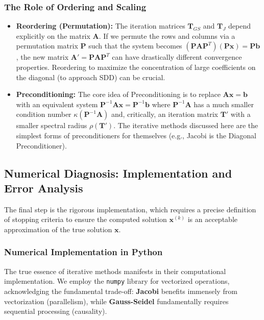 \subsubsection{The Role of Ordering and Scaling}

\begin{itemize}
    \item \textbf{Reordering (Permutation):} The iteration matrices $\mathbf{T}_{GS}$ and $\mathbf{T}_J$ depend explicitly on the matrix $\mathbf{A}$. If we permute the rows and columns via a permutation matrix $\mathbf{P}$ such that the system becomes $(\mathbf{P}\mathbf{A}\mathbf{P}^T)(\mathbf{P}\mathbf{x}) = \mathbf{P}\mathbf{b}$, the new matrix $\mathbf{A}' = \mathbf{P}\mathbf{A}\mathbf{P}^T$ can have drastically different convergence properties. Reordering to maximize the concentration of large coefficients on the diagonal (to approach SDD) can be crucial.
    \item \textbf{Preconditioning:} The core idea of Preconditioning is to replace $\mathbf{A}\mathbf{x} = \mathbf{b}$ with an equivalent system $\mathbf{P}^{-1}\mathbf{A}\mathbf{x} = \mathbf{P}^{-1}\mathbf{b}$ where $\mathbf{P}^{-1}\mathbf{A}$ has a much smaller condition number $\kappa(\mathbf{P}^{-1}\mathbf{A})$ and, critically, an iteration matrix $\mathbf{T}'$ with a smaller spectral radius $\rho(\mathbf{T}')$. The iterative methods discussed here are the simplest forms of preconditioners for themselves (e.g., Jacobi is the Diagonal Preconditioner).
\end{itemize}

\subsection{Numerical Diagnosis: Implementation and Error Analysis}

The final step is the rigorous implementation, which requires a precise definition of stopping criteria to ensure the computed solution $\mathbf{x}^{(k)}$ is an acceptable approximation of the true solution $\mathbf{x}$.

\subsubsection{Numerical Implementation in Python}

The true essence of iterative methods manifests in their computational implementation. We employ the \texttt{numpy} library for vectorized operations, acknowledging the fundamental trade-off: \textbf{Jacobi} benefits immensely from vectorization (parallelism), while \textbf{Gauss-Seidel} fundamentally requires sequential processing (causality).

